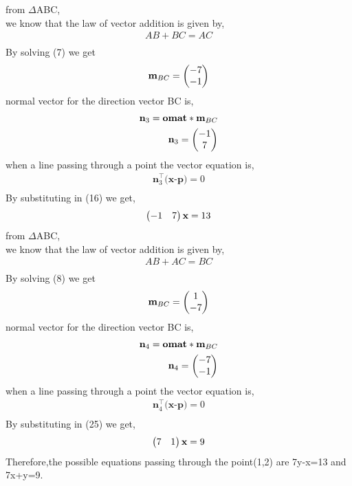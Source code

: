 from $\bm{\mathit{\Delta}}$ABC,\\
we know that the law of vector addition is given by,\\
\begin{align}
AB+BC=AC\\
\end{align}
By solving (7) we get\\
\begin{align}
\textbf{m}_{BC}=\begin{pmatrix}-7\\ -1\end{pmatrix} \\
\end{align}
normal vector for the direction vector BC is,
\begin{align}
\textbf{n}_{3}= \textbf{omat}*\textbf{m}_{BC}\\
\textbf{n}_{3}=\begin{pmatrix}-1\\ 7\end{pmatrix} \\
\end{align}
when a line passing through a point the vector equation is,
\begin{align}
\textbf{n}_{3}^{\top}\textbf{(x-p)}=0 \\
\end{align}
By substituting in (16) we get,
\begin{align}
\begin{pmatrix}-1 & 7\end{pmatrix}\textbf{x}=13\\
\end{align}
from $\bm{\mathit{\Delta}}$ABC,\\
we know that the law of vector addition is given by,\\
\begin{align}
AB+AC=BC\\
\end{align}
By solving (8) we get\\
\begin{align}
\textbf{m}_{BC}=\begin{pmatrix}1\\ -7\end{pmatrix} \\
\end{align}
normal vector for the direction vector BC is,
\begin{align}
\textbf{n}_{4}= \textbf{omat}*\textbf{m}_{BC}\\
\textbf{n}_{4}=\begin{pmatrix}-7\\ -1\end{pmatrix} \\
\end{align}
when a line passing through a point the vector equation is,
\begin{align}
\textbf{n}_{4}^{\top}\textbf{(x-p)}=0 \\
\end{align}
By substituting in (25) we get,
\begin{align}
\begin{pmatrix}7 & 1\end{pmatrix}\textbf{x}=9\\
\end{align}
  Therefore,the possible equations passing through the point(1,2) are 7y-x=13 and 7x+y=9.

